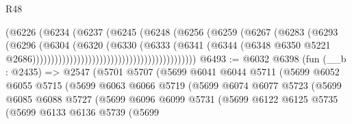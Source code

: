 \begin{lexlean}{R48}
\begin{coremodule}
                                                        (@6226
                                                          (@6234
                                                            (@6237
                                                              (@6245
                                                                (@6248
                                                                  (@6256
                                                                    (@6259
                                                                      (@6267
                                                                        (@6283
                                                                          (@6293
                                                                            (@6296
                                                                              (@6304
                                                                                (@6320
                                                                                  (@6330
                                                                                    (@6333
                                                                                      (@6341
                                                                                        (@6344
                                                                                          (@6348
                                                                                            @6350
                                                                                            @5221
                                                                                            @2686))))))))))))))))))))))))))))))))))))))))))))
@6493 := @6032
    @6398
    (fun (__b : @2435) =>
    @2547
      (@5701
        @5707
        (@5699
          @6041
          @6044
          @5711
          (@5699
            @6052
            @6055
            @5715
            (@5699
              @6063
              @6066
              @5719
              (@5699
                @6074
                @6077
                @5723
                (@5699
                  @6085
                  @6088
                  @5727
                  (@5699
                    @6096
                    @6099
                    @5731
                    (@5699
                      @6122
                      @6125
                      @5735
                      (@5699
                        @6133
                        @6136
                        @5739
                        (@5699

\end{coremodule}
\end{lexlean}
